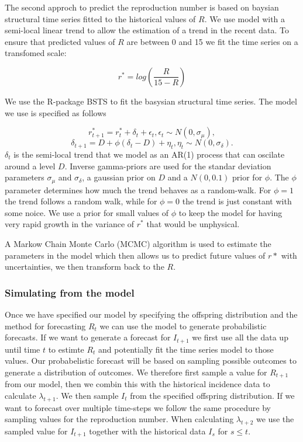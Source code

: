 \documentclass[12pt]{article}
\begin{document}
The second approch to predict the reproduction number is based on baysian structural time series fitted to the historical values of $R$. We use model with a semi-local linear trend to allow the estimation of a trend in the recent data. To ensure that predicted values of $R$ are between 0 and 15 we fit the time series on a transfomed scale:

\[ r^* = log\left(\frac{R}{15 - R}\right)\]

We use the R-package BSTS \cite{scottBstsBayesianStructural2019} to fit the basysian structural time series. The model we use is specified as follows

\[r^*_{t+1} = r^*_t + \delta_t + \epsilon_t, \epsilon_t \sim N(0, \sigma_\mu),\]
\[\delta_{t+1} = D + \phi(\delta_t - D) + \eta_t, \eta_t \sim N(0, \sigma_\delta).\]
$\delta_t$ is the semi-local trend that we model as an AR(1) process that can oscilate around a level $D$. Inverse gamma-priors are used for the standar deviation parameters $\sigma_\mu$ and $\sigma_\delta$, a gaussian prior on $D$ and a $N(0, 0.1)$ prior for $\phi$. The $\phi$ parameter determines how much the trend behaves as a random-walk. For $\phi=1$ the trend follows a random walk, while for $\phi=0$ the trend is just constant with some noice. We use a prior for small values of $\phi$ to keep the model for having very rapid growth in the variance of $r^*$ that would be unphysical. 

A Markow Chain Monte Carlo (MCMC) algorithm is used to estimate the parameters in the model which then allows us to predict future values of $r*$ with uncertainties, we then transform back to the $R$. 


\subsubsection{Simulating from the model}
Once we have specified our model by specifying the offspring distribution and the method for forecasting $R_t$ we can use the model to generate probabilistic forecasts. If we want to generate a forecast for $I_{t+1}$ we first use all the data up until time $t$ to estimte $R_t$ and potentially fit the time series model to those values. Our probabelistic forecast will be based on sampling possible outcomes to generate a distribution of outcomes. We therefore first sample a value for $R_{t+1}$ from our model, then we combin this with the historical incidence data to calculate $\lambda_{t+1}$. We then sample $I_t$ from the specified offspring distribution. If we want to forecast over multiple time-steps we follow the same procedure by sampling values for the reproduction number. When calculating $\lambda_{t+2}$ we use the sampled value for $I_{t+1}$ together with the historical data ${I_s}$ for $s\leq t$. 
\end{document}
